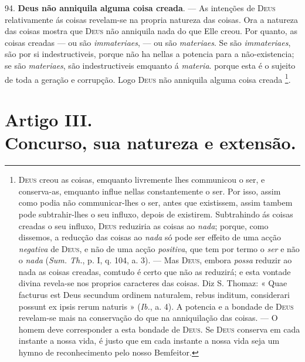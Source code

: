  94. \textbf{Deus não anniquila alguma coisa creada}. --- As intenções de \textsc{Deus} relativamente ás coisas revelam-se na propria natureza das coisas. Ora a natureza das coisas mostra que \textsc{Deus} não anniquila nada do que Elle creou. Por quanto, as coisas creadas --- ou são \emph{immateriaes}, --- ou são \emph{materiaes}. Se são \emph{immateriaes}, são por si indestructiveis, porque não ha nellas a potencia para a não-existencia; se são \emph{materiaes}, são indestructiveis emquanto á \emph{materia}. porque esta é o sujeito de toda a geração e corrupção. Logo \textsc{Deus} não anniquila alguma coisa creada \footnote{\textsc{Deus} creou as coisas, emquanto livremente lhes communicou o ser, e conserva-as, emquanto influe nellas constantemente o ser. Por isso, assim como podia não communicar-lhes o ser, antes que existissem, assim tambem pode subtrahir-lhes o seu influxo, depois de existirem. Subtrahindo ás coisas creadas o seu influxo, \textsc{Deus} reduziria as coisas ao \emph{nada}; porque, como dissemos, a reducção das coisas ao \emph{nada} só pode ser effeito de uma acção \emph{negativa} de \textsc{Deus}, e não de uma acção \emph{positiva}, que tem por termo o \emph{ser} e não o \emph{nada} (\emph{Sum. Th.}, p. I, q. 104, a. 3). --- Mas \textsc{Deus}, embora \emph{possa} reduzir ao nada as coisas creadas, comtudo é certo que não as reduzirá; e esta vontade divina revela-se nos proprios caracteres das coisas. Diz S. Thomaz: « Quae facturus est Deus secundum ordinem naturalem, rebus inditum, considerari possunt ex ipsis rerum naturis » (\emph{Ib.}, a. 4). A potencia e a bondade de \textsc{Deus} revelam-se mais na conservação do que na anniquilação das coisas. --- O homem deve corresponder a esta bondade de \textsc{Deus}. Se \textsc{Deus} conserva em cada instante a nossa vida, é justo que em cada instante a nossa vida seja um hymno de reconhecimento pelo nosso Bemfeitor.}.


\section*{Artigo III.\\ Concurso, sua natureza e extensão.}

